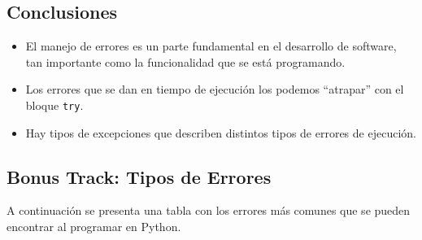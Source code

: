 \documentclass[
  letterpaper,
  DIV=11,
  numbers=noendperiod]{scrreprt}
\providecommand{\tightlist}{%
  \setlength{\itemsep}{0pt}\setlength{\parskip}{0pt}}\usepackage{longtable,booktabs,array}
\begin{document}
\subsection{Conclusiones}\label{conclusiones-1}

\begin{itemize}
\tightlist
\item
  El manejo de errores es un parte fundamental en el desarrollo de
  software, tan importante como la funcionalidad que se está
  programando.
\item
  Los errores que se dan en tiempo de ejecución los podemos ``atrapar''
  con el bloque \texttt{try}.
\item
  Hay tipos de excepciones que describen distintos tipos de errores de
  ejecución.
\end{itemize}

\subsection{Bonus Track: Tipos de
Errores}\label{bonus-track-tipos-de-errores}

A continuación se presenta una tabla con los errores más comunes que se
pueden encontrar al programar en Python.
\end{document}
